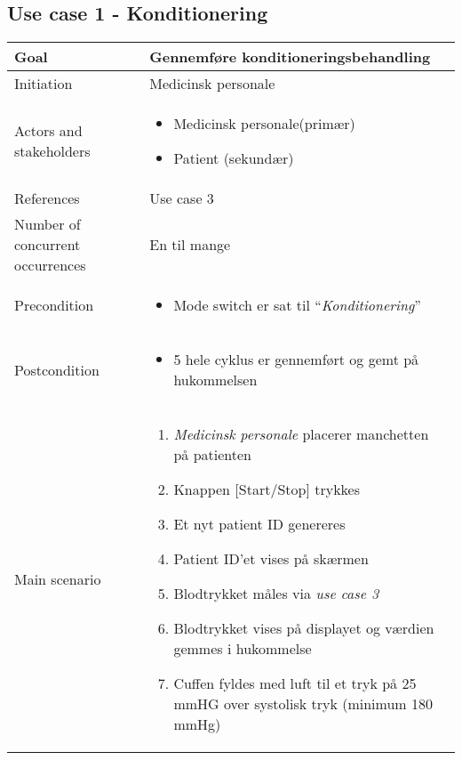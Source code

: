 \subsection{Use case 1 - Konditionering}
\begin{center}
		\begin{longtable}{ | m{4cm} | m{8cm}| } 
			\hline
			Goal& Gennemføre konditioneringsbehandling  \\ 
			\hline
			Initiation &  Medicinsk personale\\
			\hline
			Actors and stakeholders & 
			\begin{itemize}
				\item Medicinsk personale(primær)
				\item Patient (sekundær)
			\end{itemize} \\ 
			\hline
			References & Use case 3 \\ 
			\hline
			Number of concurrent occurrences & En til mange\\ 
			\hline	
			Precondition & 
			\begin{itemize}
				\item Mode switch er sat til “\textit{Konditionering}”
			\end{itemize} \\ 
			\hline
			Postcondition & 
			\begin{itemize}
				\item 5 hele cyklus er gennemført og gemt på hukommelsen
			\end{itemize} \\ 
			\hline
			Main scenario & \begin{enumerate}
				\setlength\itemsep{0cm} %
				\item \textit{Medicinsk personale} placerer manchetten på patienten
				\item Knappen [Start/Stop] trykkes
				\item Et nyt patient ID genereres
				\subitem[Extension \#1] 
				\item Patient ID’et vises på skærmen
				\item Blodtrykket måles via \textit{use case 3}
				\subitem[Extension \#2]
				\item Blodtrykket vises på displayet og værdien gemmes i hukommelse
				\item Cuffen fyldes med luft til et tryk på 25 mmHG over systolisk tryk (minimum 180 mmHg)
			\end{enumerate} \\ 

\end{longtable}
\end{center}

